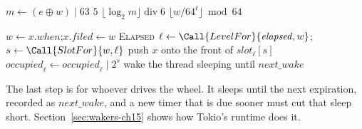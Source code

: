 \begin{algorithm}[htbp]
    \caption{Choosing a level and a slot.}
    \label{alg:tw-level-for}
    \begin{algorithmic}[1]
            \State $m \gets (e \oplus w) \mathbin{|} 63$
                \State \Return $5$
            \EndIf
            \State \Return $\lfloor \log_2 m \rfloor \operatorname{div} 6$
        \EndFunction
        \Statex
            \State \Return $\lfloor w / 64^{\ell} \rfloor \bmod 64$
        \EndFunction
    \end{algorithmic}
\end{algorithm}

\begin{algorithm}[htbp]
    \caption{Inserting a timer, under the driver lock.}
    \label{alg:tw-insert}
    \begin{algorithmic}[1]
            \State $w \gets x.\mathit{when}$;\enspace $x.\mathit{filed} \gets w$
                \State \Return \textsc{Elapsed}
            \EndIf
            \State $\ell \gets \Call{LevelFor}{\mathit{elapsed}, w}$;\enspace $s \gets \Call{SlotFor}{w, \ell}$
            \State push $x$ onto the front of $\mathit{slot}_\ell[s]$
            \State $\mathit{occupied}_\ell \gets \mathit{occupied}_\ell \mathbin{|} 2^{s}$
                \State wake the thread sleeping until $\mathit{next\_wake}$
            \EndIf
        \EndFunction
    \end{algorithmic}
\end{algorithm}

The last step is for whoever drives the wheel. It sleeps until the next expiration, recorded as $\mathit{next\_wake}$, and a new timer that is due sooner must cut that sleep short. Section~\ref{sec:wakers-ch15} shows how Tokio's runtime does it.

